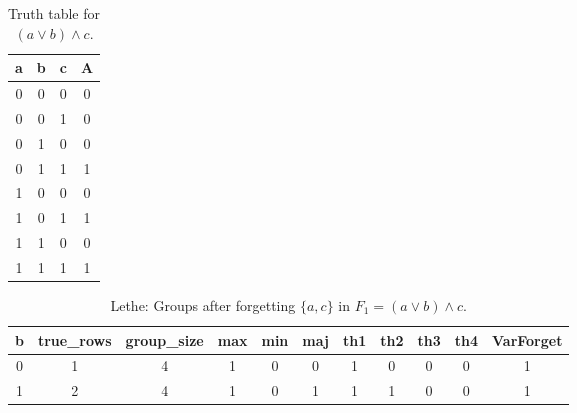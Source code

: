 \begin{table}[!tb]
    \centering
    \begin{tabular}{|c|c|c|c|}
        \hline
        \textbf{a} & \textbf{b} & \textbf{c} & \textbf{A} \\ \hline
        0 & 0 & 0 & 0 \\ \hline
        0 & 0 & 1 & 0 \\ \hline
        0 & 1 & 0 & 0 \\ \hline
        0 & 1 & 1 & 1 \\ \hline
        1 & 0 & 0 & 0 \\ \hline
        1 & 0 & 1 & 1 \\ \hline
        1 & 1 & 0 & 0 \\ \hline
        1 & 1 & 1 & 1 \\ \hline
    \end{tabular}
    \caption{Truth table for $(a \lor b) \land c$.}
    \label{tab:truthtab}
\end{table}

\begin{table}[!tb]
    \centering
    \begin{tabular}{|c|c|c|c|c|c|c|c|c|c|c|}
        \hline
        \textbf{b} & \textbf{true\_rows} & \textbf{group\_size} & \textbf{max} & \textbf{min} & \textbf{maj} & \textbf{th1} & \textbf{th2} & \textbf{th3} & \textbf{th4} & \textbf{VarForget} \\ \hline
        \rowcolor{gray!40} 0 & 1 & 4 & 1 & 0 & 0 & 1 & 0 & 0 & 0 & 1 \\ \hline
        \rowcolor{blue!40} 1 & 2 & 4 & 1 & 0 & 1 & 1 & 1 & 0 & 0 & 1 \\ \hline
    \end{tabular}
    \caption{Lethe: Groups after forgetting $\{a, c\}$ in $F_{1} = (a \lor b) \land c$.}
    \label{tab:lethe-F1-ac-groups}
\end{table}
